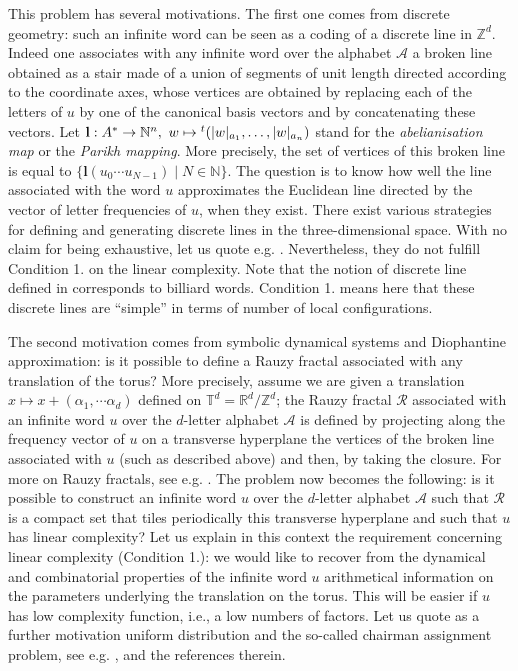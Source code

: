 \documentclass[preliminary,copyright,creativecommons]{eptcs}
\newcommand{\tr}{\vphantom{A}^t}
\newcommand{\N}{\mathbb{N}}
\begin{document}
This problem   has  several motivations.   The first one  comes  from  discrete geometry:    such  an infinite word
can be seen as a coding  of a discrete  line in $\mathbb{Z}^d$. Indeed  one associates with      any infinite word
over the alphabet  ${\mathcal A}$ a  broken line     obtained   as a  stair made of a  union of segments of unit length  directed  according to the  coordinate axes, 
 whose  vertices  are obtained    by replacing each of the letters   of $u$  by one of the      canonical  basis    vectors
 and by concatenating these vectors.  Let 
  ${\mathbf l}:A^*\to\N^n, \ w\mapsto \tr(|w|_{a_1},\ldots,|w|_{a_n})$
    stand for  the {\em   abelianisation map}   or 
   the {\em Parikh mapping}.
   More precisely, the set of vertices  of  this broken line    is  equal to 
 $\{{\mathbf l}(u_0 \cdots u_{N-1}) \mid
N\in \N\}$. The question is to know how  well the line  associated with the word $u$  approximates  the   Euclidean line
  directed by the  vector  of letter  frequencies of $u$,  when they exist.    There exist   various    strategies  for defining and generating discrete lines in the three-dimensional space. With no claim
   for being exhaustive, let us quote  e.g.
\cite{andres,BB09,FigRev96,toutant_characterization_2006}. 
Nevertheless, they    do not   fulfill     Condition  1.  on the linear complexity. Note that the  notion of discrete line  defined  in \cite{andres} corresponds
to billiard  words.      Condition 1. means here   that  these  discrete lines  are  ``simple'' in terms of number of local configurations.


The second motivation comes from   symbolic dynamical systems and  Diophantine approximation:
is it possible  to define a Rauzy fractal     associated  with any   translation  of the  torus?
More precisely,   assume   we are given a      translation $ x \mapsto   x+ (\alpha_1, \cdots  \alpha_d)$   defined on $
\mathbb{T}^d = {\mathbb R}^d / {\mathbb Z}^d$;     the  Rauzy fractal ${\mathcal R}$ associated  with   an infinite  word $u $  over  the $d$-letter alphabet ${\mathcal A}$ is defined  
  by  projecting    along  the  frequency vector of $u$   on a transverse   hyperplane  the vertices   of the broken line associated with 
$u$  (such as described   above)  and   then, by  taking the closure. For more on Rauzy fractals, see  e.g.  \cite{BertheSiegel2005}. The problem now becomes the following:
   is it    possible  to construct an infinite  word $u $  over  the $d$-letter alphabet ${\mathcal A}$
 such that
${\mathcal R}$ is a  compact set that tiles periodically this transverse hyperplane and such that
$u$ has linear complexity? Let us explain in this context the  requirement  concerning linear  complexity (Condition 1.):  we would like to recover from  the
dynamical and combinatorial properties of the  infinite  word $u$  arithmetical information   on the parameters  underlying the  translation on the torus.
This will be easier if   $u$   has low complexity function,  i.e., a low  numbers of factors.  
Let us quote as a further motivation uniform distribution and   the  so-called   chairman assignment problem, see  e.g.   \cite{tij},  and the references  therein.
 
\end{document}
